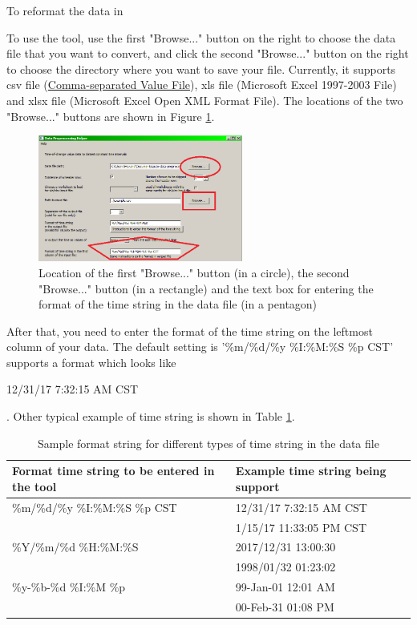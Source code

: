\documentclass[12pt,a4paper]{article}
\begin{document}
To reformat the data in \

To use the tool, use the first "Browse..." button on the right to choose the data file that you want to convert, and click the second "Browse..." button on the right to choose the directory where you want to save your file. Currently, it supports csv file (\href{https://en.wikipedia.org/wiki/Comma-separated_values}{Comma-separated Value File}), xls file (Microsoft Excel 1997-2003 File) and xlsx file (Microsoft Excel Open XML Format File). The locations of the two "Browse..." buttons are shown in Figure \ref{fig:ui_zoomed}.

\begin{figure}[H]
\centering
\includegraphics[width=0.6\textwidth]{ui_zoomed.png}
\caption{Location of the first "Browse..." button (in a circle), the second "Browse..." button (in a rectangle) and the text box for entering the format of the time string in the data file (in a pentagon)}
\label{fig:ui_zoomed}
\end{figure}

After that, you need to enter the format of the time string on the leftmost column of your data. The default setting is '\%m/\%d/\%y \%I:\%M:\%S \%p CST' supports a format which looks like

12/31/17 7:32:15 AM CST

. Other typical example of time string is shown in Table \ref{tb:sample_timestring}.

\begin{table}[H]
\caption{Sample format string for different types of time string in the data file}
\begin{tabular}{|p{6cm}|l|}
\hline
Format time string to be entered in the tool & Example time string being support \\ \hline
\%m/\%d/\%y \%I:\%M:\%S \%p CST & 12/31/17 7:32:15 AM CST  \\
 & 1/15/17 11:33:05 PM CST \\ \hline
\%Y/\%m/\%d \%H:\%M:\%S & 2017/12/31 13:00:30  \\
 & 1998/01/32 01:23:02 \\ \hline
 \%y-\%b-\%d \%I:\%M \%p & 99-Jan-01 12:01 AM \\
 & 00-Feb-31 01:08 PM \\ \hline
\end{tabular}
\label{tb:sample_timestring}
\end{table}
\end{document}
